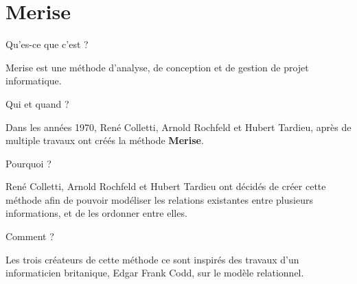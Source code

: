 \hypertarget{merise}{%
\section{Merise}\label{merise}}

\begin{frame}{Qu'es-ce que c'est ?}
\protect\hypertarget{ques-ce-que-cest}{}

Merise est une méthode d'analyse, de conception et de gestion de projet
informatique.

\end{frame}

\begin{frame}{Qui et quand ?}
\protect\hypertarget{qui-et-quand}{}

Dans les années 1970, René Colletti, Arnold Rochfeld et Hubert Tardieu,
après de multiple travaux ont créés la méthode \textbf{Merise}.

\end{frame}

\begin{frame}{Pourquoi ?}
\protect\hypertarget{pourquoi}{}

René Colletti, Arnold Rochfeld et Hubert Tardieu ont décidés de créer
cette méthode afin de pouvoir modéliser les relations existantes entre
plusieurs informations, et de les ordonner entre elles.

\end{frame}

\begin{frame}{Comment ?}
\protect\hypertarget{comment}{}

Les trois créateurs de cette méthode ce sont inspirés des travaux d'un
informaticien britanique, Edgar Frank Codd, sur le modèle relationnel.

\end{frame}